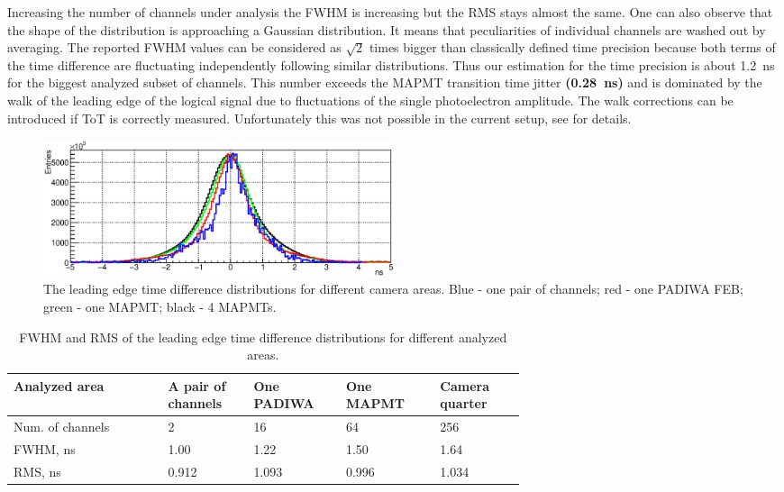 \documentclass[final,5p,times,twocolumn]{elsarticle}
\begin{document}
Increasing the number of channels under analysis the FWHM is increasing but the RMS stays almost the same. One can also observe that the shape of the distribution is approaching a Gaussian distribution. It means that peculiarities of individual channels are washed out by averaging. The reported FWHM values can be considered as $ \sqrt 2 $ times bigger than classically defined time precision because both terms of the time difference are fluctuating independently following similar distributions. Thus our estimation for the time precision is about 1.2~ns for the biggest analyzed subset of channels. This number exceeds the MAPMT transition time jitter \textbf{(0.28~ns)} and is dominated by the walk of the leading edge of the logical signal due to fluctuations of the single photoelectron amplitude. The walk corrections can be introduced if ToT is correctly measured. Unfortunately this was not possible in the current setup, see \cite{PEPAN} for details.

\begin{figure}[h]
	\centering
	\includegraphics[width=0.5\textwidth]{figures/TimePrecision_evolution_noStats2.eps}
	\caption{The leading edge time difference distributions for different camera areas. Blue - one pair of channels; red - one PADIWA FEB; green - one MAPMT; black - 4 MAPMTs.}
	\label{fig:TimePrec}
\end{figure}

\begin{table}[h]
\centering
	\begin{tabular}{ | p{0.22\linewidth} | p{0.10\linewidth} | p{0.10\linewidth} | p{0.12\linewidth} | p{0.12\linewidth} | }
		\hline		
		\scriptsize{Analyzed area} & \scriptsize{A pair of channels} & \scriptsize{One PADIWA} & \scriptsize{One MAPMT} & \scriptsize{Camera quarter} \\
		\hline
		\scriptsize{Num. of channels} & 2 & 16 & 64 & 256\\
		\hline
		\scriptsize{FWHM, ns} & 1.00 & 1.22 & 1.50 & 1.64\\
		\hline
		\scriptsize{RMS, ns} & 0.912 & 1.093 & 0.996 & 1.034\\
		\hline
	\end{tabular}

	\caption{FWHM and RMS of the leading edge time difference distributions for different analyzed areas.}
	\label{tabl:TimePrecTable}

\end{table}
\end{document}
